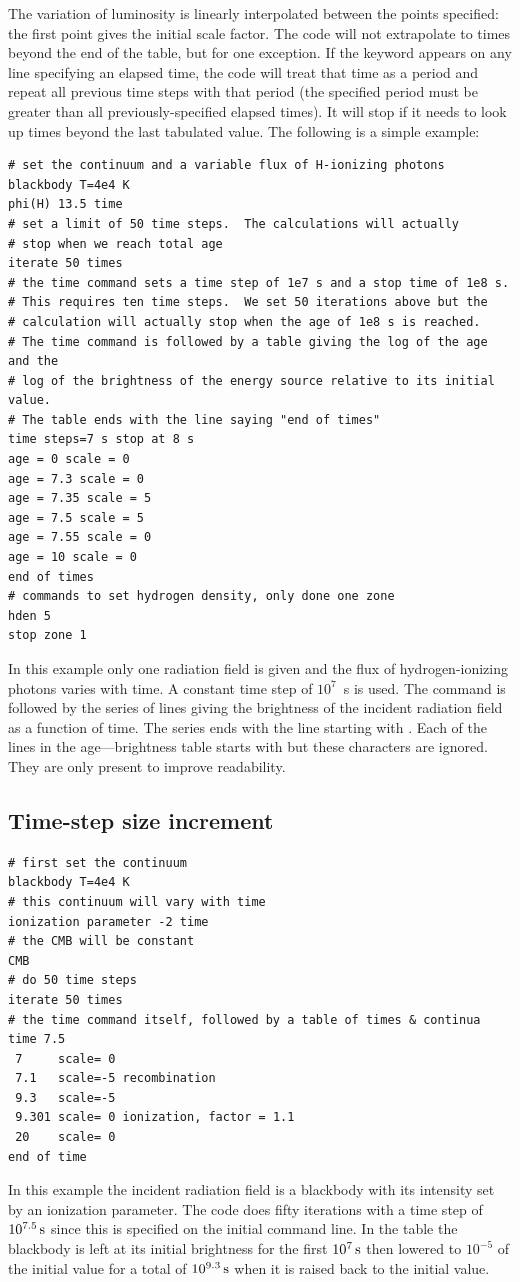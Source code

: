 \begin{shaded}
The variation of luminosity is linearly interpolated between the 
points specified: the first point gives the initial scale factor.
The code will not extrapolate to times
beyond the end of the table, but for one exception.  If the keyword 
appears on any line specifying an elapsed time, the code will treat that time as a
period and repeat all previous time steps with that period (the specified period
must be greater than all previously-specified elapsed times).
It will stop if it needs to look up times
beyond the last tabulated value.
The following is a simple example:
\begin{verbatim}
# set the continuum and a variable flux of H-ionizing photons
blackbody T=4e4 K
phi(H) 13.5 time
# set a limit of 50 time steps.  The calculations will actually
# stop when we reach total age
iterate 50 times
# the time command sets a time step of 1e7 s and a stop time of 1e8 s.
# This requires ten time steps.  We set 50 iterations above but the
# calculation will actually stop when the age of 1e8 s is reached.
# The time command is followed by a table giving the log of the age and the
# log of the brightness of the energy source relative to its initial value.
# The table ends with the line saying "end of times"
time steps=7 s stop at 8 s
age = 0 scale = 0
age = 7.3 scale = 0
age = 7.35 scale = 5
age = 7.5 scale = 5
age = 7.55 scale = 0
age = 10 scale = 0
end of times
# commands to set hydrogen density, only done one zone
hden 5
stop zone 1
\end{verbatim}

In this example only one radiation field is given and the flux of
hydrogen-ionizing photons varies with time.  A constant time step of $10^7$~s is used.
The  command is followed by the series of lines giving the
brightness of the incident radiation field as a function of time.
The series ends with the line
starting with .
Each of the lines in the age---brightness table starts
with  but these characters are ignored.
They are only present to improve readability.

\subsection{Time-step size increment}
\begin{verbatim}
# first set the continuum
blackbody T=4e4 K
# this continuum will vary with time
ionization parameter -2 time
# the CMB will be constant
CMB
# do 50 time steps
iterate 50 times
# the time command itself, followed by a table of times & continua
time 7.5
 7     scale= 0
 7.1   scale=-5 recombination
 9.3   scale=-5
 9.301 scale= 0 ionization, factor = 1.1
 20    scale= 0
end of time
\end{verbatim}
In this example the incident radiation field is a blackbody
with its intensity set by an ionization parameter.
The code does fifty iterations with a time step of
$10^{7.5} {\rm\thinspace s}$ since this is specified on the initial  command line.
In the
table the blackbody is left at its initial brightness
for the first $10^7 {\rm\thinspace s}$ then
lowered to $10^{-5}$ of the initial value
for a total of $10^{9.3} {\rm\thinspace s}$ when it is
raised back to the initial value.


\end{shaded}
